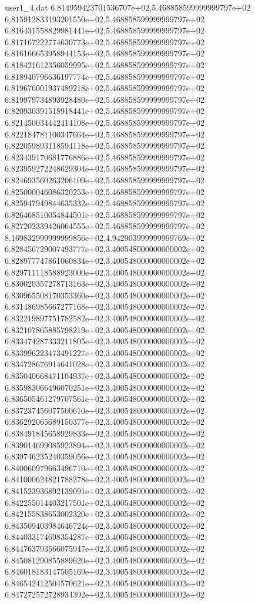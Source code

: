 \begin{filecontents}{user1_4.dat}
6.814959423701536707e+02,5.468858599999999797e+02
6.815912833193201550e+02,5.468858599999999797e+02
6.816431558829981441e+02,5.468858599999999797e+02
6.817167222774630773e+02,5.468858599999999797e+02
6.816166653958944153e+02,5.468858599999999797e+02
6.818421612356059995e+02,5.468858599999999797e+02
6.818940796636197774e+02,5.468858599999999797e+02
6.819676001937489218e+02,5.468858599999999797e+02
6.819979734893928480e+02,5.468858599999999797e+02
6.820930391518918441e+02,5.468858599999999797e+02
6.821450034442414108e+02,5.468858599999999797e+02
6.822184781100347664e+02,5.468858599999999797e+02
6.822059893118594118e+02,5.468858599999999797e+02
6.823439170681776886e+02,5.468858599999999797e+02
6.823959272248629304e+02,5.468858599999999797e+02
6.824693560263206109e+02,5.468858599999999797e+02
6.825000046086320253e+02,5.468858599999999797e+02
6.825947949844635332e+02,5.468858599999999797e+02
6.826468510054844501e+02,5.468858599999999797e+02
6.827202339426064555e+02,5.468858599999999797e+02
8.169832999999999856e+02,4.942903999999999769e+02
6.828456729007493777e+02,3.400548000000000002e+02
6.828977747861060834e+02,3.400548000000000002e+02
6.829711118588923000e+02,3.400548000000000002e+02
6.830020357278713163e+02,3.400548000000000002e+02
6.830965508170353360e+02,3.400548000000000002e+02
6.831486985667277168e+02,3.400548000000000002e+02
6.832219897751782582e+02,3.400548000000000002e+02
6.832107865885798219e+02,3.400548000000000002e+02
6.833474287333211805e+02,3.400548000000000002e+02
6.833996223473491227e+02,3.400548000000000002e+02
6.834728676914641028e+02,3.400548000000000002e+02
6.835040668471104937e+02,3.400548000000000002e+02
6.835983066496070251e+02,3.400548000000000002e+02
6.836505461279707561e+02,3.400548000000000002e+02
6.837237456077500610e+02,3.400548000000000002e+02
6.836292065689150377e+02,3.400548000000000002e+02
6.838491845658929833e+02,3.400548000000000002e+02
6.839014699085923894e+02,3.400548000000000002e+02
6.839746235240359056e+02,3.400548000000000002e+02
6.840060979663496710e+02,3.400548000000000002e+02
6.841000624821788278e+02,3.400548000000000002e+02
6.841523936892139091e+02,3.400548000000000002e+02
6.842255014403217501e+02,3.400548000000000002e+02
6.842155838653002320e+02,3.400548000000000002e+02
6.843509403984646724e+02,3.400548000000000002e+02
6.844033174698354287e+02,3.400548000000000002e+02
6.844763793566075947e+02,3.400548000000000002e+02
6.845081290855889620e+02,3.400548000000000002e+02
6.846018183147505169e+02,3.400548000000000002e+02
6.846542412504570621e+02,3.400548000000000002e+02
6.847272572728934392e+02,3.400548000000000002e+02

\end{filecontents}
